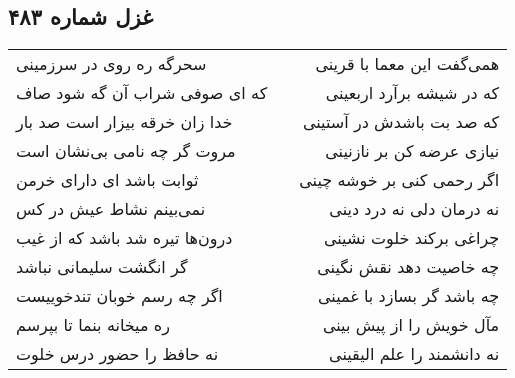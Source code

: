 \begin{center}
\section*{غزل شماره ۴۸۳}
\label{sec:sh483}
\begin{longtable}{l p{0.5cm} r}
سحرگه ره روی در سرزمینی
&&
همی‌گفت این معما با قرینی
\\
که ای صوفی شراب آن گه شود صاف
&&
که در شیشه برآرد اربعینی
\\
خدا زان خرقه بیزار است صد بار
&&
که صد بت باشدش در آستینی
\\
مروت گر چه نامی بی‌نشان است
&&
نیازی عرضه کن بر نازنینی
\\
ثوابت باشد ای دارای خرمن
&&
اگر رحمی کنی بر خوشه چینی
\\
نمی‌بینم نشاط عیش در کس
&&
نه درمان دلی نه درد دینی
\\
درون‌ها تیره شد باشد که از غیب
&&
چراغی برکند خلوت نشینی
\\
گر انگشت سلیمانی نباشد
&&
چه خاصیت دهد نقش نگینی
\\
اگر چه رسم خوبان تندخوییست
&&
چه باشد گر بسازد با غمینی
\\
ره میخانه بنما تا بپرسم
&&
مآل خویش را از پیش بینی
\\
نه حافظ را حضور درس خلوت
&&
نه دانشمند را علم الیقینی
\\
\end{longtable}
\end{center}
